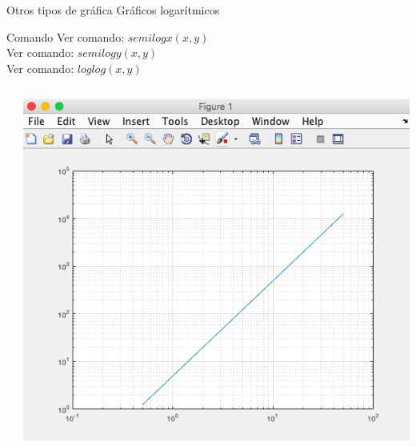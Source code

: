 \documentclass{bredelebeamer}
\begin{document}
\begin{frame}{Otros tipos de gráfica}
Gráficos logarítmicos
\begin{exampleblock}{Comando}
Ver comando: \textbf{$semilogx(x,y)$}\\
Ver comando: \textbf{$semilogy(x,y)$}\\
Ver comando: \textbf{$loglog(x,y)$}
\end{exampleblock}
\begin{columns}
\begin{column}{0.5\textwidth}
\begin{center}
\end{center}
\end{column}
\begin{column}{0.5\textwidth}
\begin{center}
\includegraphics[scale=0.2]{images/pantalla23.png}
\end{center}
\end{column}
\end{columns}
\end{frame}
\end{document}
